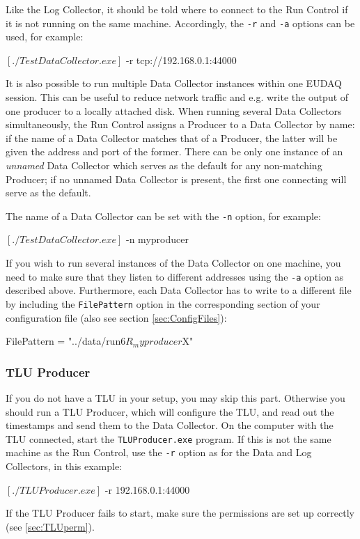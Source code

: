 Like the Log Collector, it should be told where to connect to the Run Control if it is not running on the same machine.
Accordingly, the \texttt{-r} and \texttt{-a} options can be used, for example:
\begin{listing}[mybash]
$[./TestDataCollector.exe]$ -r tcp://192.168.0.1:44000
\end{listing}

It is also possible to run multiple Data Collector instances within
one EUDAQ session. 
This can be useful to reduce network traffic and
e.g. write the output of one producer to a locally attached disk. 
When running several Data Collectors simultaneously, the Run Control assigns a
Producer to a Data Collector by name: if the name of a Data Collector
matches that of a Producer, the latter will be given the address and
port of the former. 
There can be only one instance of an \emph{unnamed} Data
Collector which serves as the default for any non-matching Producer;
if no unnamed Data Collector is present, the first one connecting will
serve as the default.

The name of a Data Collector can be set with the
\texttt{-n} option, for example:
\begin{listing}[mybash]
$[./TestDataCollector.exe]$ -n myproducer
\end{listing}

If you wish to run several instances of the Data Collector on one
machine, you need to make sure that they listen to different addresses
using the \texttt{-a} option as described above. 
Furthermore, each Data Collector has to write to a different file by including the
\texttt{FilePattern} option in the corresponding section of your
configuration file (also see section \ref{sec:ConfigFiles}):

\begin{listing}
FilePattern = "../data/run$6R_myproducer$X"
\end{listing}

\subsubsection{TLU Producer}
\label{sec:tluproducer}
If you do not have a \gls{TLU} in your setup, you may skip this part.
Otherwise you should run a TLU Producer, which will configure the \gls{TLU},
and read out the timestamps and send them to the Data Collector.
On the computer with the \gls{TLU} connected, start the \texttt{TLUProducer.exe} program.
If this is not the same machine as the Run Control,
use the \texttt{-r} option as for the Data and Log Collectors, in this example:
\begin{listing}[mybash]
$[./TLUProducer.exe]$ -r 192.168.0.1:44000
\end{listing}
If the TLU Producer fails to start, make sure the permissions are set up correctly (see \autoref{sec:TLUperm}).

